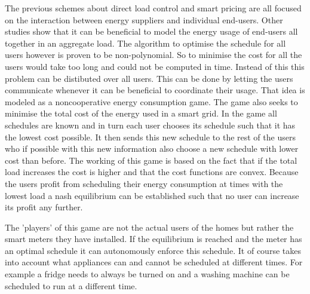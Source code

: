The previous schemes about direct load control and smart pricing are all focused on the interaction between energy suppliers and individual end-users. Other studies show \cite{Mohsenian-RadWongJatskevichEtAl2010a, SalinasLiLi2013} that it can be beneficial to model the energy usage of end-users all together in an aggregate load. The algorithm to optimise the schedule for all users however is proven to be non-polynomial. \cite{CaronKesidis2010} So to minimise the cost for all the users would take too long and could not be computed in time. Instead of this this problem can be distibuted over all users. This can be done by letting the users communicate whenever it can be beneficial to coordinate their usage. That idea is modeled as a noncooperative energy consumption game. The game also seeks to minimise the total cost of the energy used in a smart grid. In the game all schedules are known and in turn each user chooses its schedule such that it has the lowest cost possible. It then sends this new schedule to the rest of the users who if possible with this new information also choose a new schedule with lower cost than before. The working of this game is based on the fact that if the total load increases the cost is higher and that the cost functions are convex. Because the users profit from scheduling their energy consumption at times with the lowest load a nash equilibrium can be established such that no user can increase its profit any further. \cite{Mohsenian-RadWongJatskevichEtAl2010a}

The 'players' of this game are not the actual users of the homes but rather the smart meters they have installed. If the equilibrium is reached and the meter has an optimal schedule it can autonomously enforce this schedule. It of course takes into account what appliances can and cannot be scheduled at different times. For example a fridge needs to always be turned on and a washing machine can be scheduled to run at a different time. \cite{DepuruWangDevabhaktuni2011a} 
